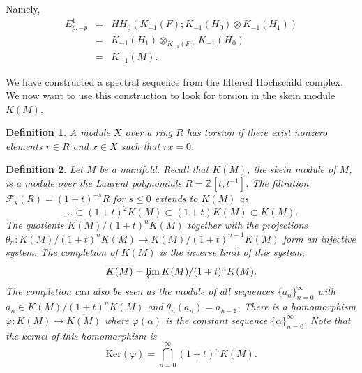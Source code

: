\documentclass{slides}
\newcommand{\ot}{\otimes}
\newtheorem{definition}{Definition}
\begin{document}
\begin{slide}
Namely,
\begin{eqnarray}
E^1_{p,-p}
& = & HH_0 \left( K_{-1}(F) ; K_{-1}(H_0) \ot K_{-1}(H_1) \right) \nonumber \\
& = & K_{-1}(H_1) \ot_{K_{-1}(F)} K_{-1}(H_0) \nonumber \\
& = & K_{-1}(M). \nonumber
\end{eqnarray}

We have constructed a spectral sequence from the
filtered Hochschild complex.  We now want to use this
construction to look for torsion in the skein module $K(M)$.

\vspace{2cm}

\begin{definition}
A module $X$ over a ring $R$ has \textit{torsion} if there
exist nonzero elements $r \in R$ and $x \in X$ such that
$rx = 0$.
\end{definition}
\end{slide}

\begin{slide}
\begin{definition}
Let $M$ be a manifold. Recall that $K(M)$, the skein module
of $M$, is a module over the Laurent polynomials
$R=\mathbb{Z}[t,t^{-1}]$.
The filtration $\mathcal{F}_s(R) = (1+t)^{-s} R$ for $s \leq 0$
extends to $K(M)$ as
\[
\dots \subset (1+t)^2 K(M) \subset (1+t) K(M)
\subset K(M).
\]
The quotients $K(M) / (1+t)^n K(M)$ together with the projections
$\theta_n : K(M) / (1+t)^n K(M) \to K(M) / (1+t)^{n-1} K(M)$ form an
injective system.
The \textit{completion} of $K(M)$ is the inverse limit of this system,
\[
\overline{K(M)} = \varprojlim K(M) / (1+t)^n K(M).
\]
The completion can also be seen as the module of all sequences
$\{ a_n \}_{n=0}^{\infty}$ with $a_n \in K(M) / (1+t)^n K(M)$ and $\theta_n(a_n) = a_{n-1}$.
There is a homomorphism $\varphi : K(M) \to \overline{K(M)}$ where
$\varphi ( \alpha)$ is the constant sequence $\{ \alpha \}_{n=0}^{\infty}$.
Note that the kernel of this homomorphism is
\[
\mathrm{Ker}(\varphi) = \bigcap_{n=0}^{\infty}(1+t)^n K(M).
\]
\end{definition}
\end{slide}
\end{document}
